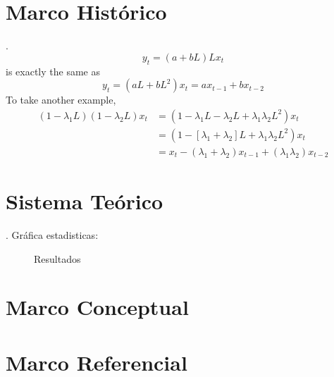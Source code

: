 			\section{ Marco Histórico}\label{Sec: Marco Histórico}
				\lipsum[11].
				\begin{equation}\label{eq: LAG1}
					y_{t} = (a + bL)Lx_{t}
				\end{equation}
				is exactly the same as
				\begin{equation}\label{LAG2}
					y_{t} = (aL + bL^{2})x_{t} = ax_{t-1} + bx_{t-2}
				\end{equation}
				To take another example, 
				\begin{equation}\label{eq: LAG3}
					\begin{aligned}
						(1-\lambda_{1}L)(1-\lambda_{2}L)x_{t} &= 
						(1-\lambda_{1}L-\lambda_{2}L + \lambda_{1}\lambda_{2}L^{2})x_{t}\\
						&= 
						(1-\left[\lambda_{1}+\lambda_{2}\right]L + \lambda_{1}\lambda_{2}L^{2})x_{t}\\
						&= 
						x_{t}-(\lambda_{1} + \lambda_{2})x_{t-1} + (\lambda_{1}\lambda_{2})x_{t-2}
					\end{aligned}
				\end{equation}
			\section{Sistema Teórico}\label{Sec: Sistema Teórico}
				\lipsum[12].
				Gráfica estadisticas:
				\begin{figure}[H]
					\centering
					\caption{Resultados}
					\label{fig: Pie}
				\end{figure}
			\section{Marco Conceptual }\label{Sec: Marco Conceptual }
				\lipsum[13]
			\section{Marco Referencial}\label{Sec: Marco Referencial}
				\lipsum[14]	
					
	